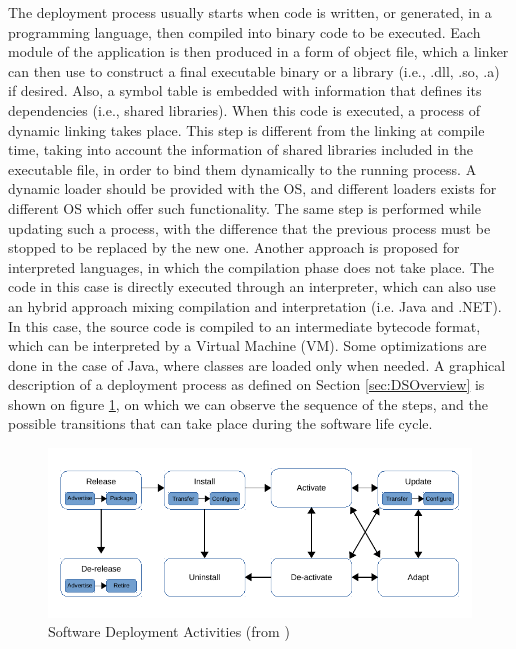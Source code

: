 The deployment process usually starts when code is written, or generated, in a programming language, then compiled into binary code to be executed.
Each module of the application is then produced in a form of object file, which a linker can then use to construct a final executable binary or a library (i.e., .dll, .so, .a) if desired.
Also, a symbol table is embedded with information that defines its dependencies (i.e., shared libraries).
When this code is executed, a process of dynamic linking takes place.
This step is different from the linking at compile time, taking into account the information of shared libraries included in the executable file, in order to bind them dynamically to the running process.
A dynamic loader should be provided with the OS, and different loaders exists for different OS which offer such functionality.
The same step is performed while updating such a process, with the difference that the previous process must be stopped to be replaced by the new one.
Another approach is proposed for interpreted languages, in which the compilation phase does not take place.
The code in this case is directly executed through an interpreter, which can also use an hybrid approach mixing compilation and interpretation (i.e. Java and .NET).
In this case, the source code is compiled to an intermediate bytecode format, which can be interpreted by a Virtual Machine (VM).
Some optimizations are done in the case of Java, where classes are loaded only when needed.
A graphical description of a deployment process as defined on Section \ref{sec:DSOverview} is shown on figure \ref{fig:DeployActivities}, on which we can observe the sequence of the steps, and the possible transitions that can take place during the software life cycle.

\begin{figure}[htb]
	\centering
	\includegraphics[width=1\columnwidth]{chapters/stateOfTheArt.images/DeploymentActivities.pdf}
	\caption{Software Deployment Activities (from  \cite{gunalp2014continuous})}
	\label{fig:DeployActivities}
\end{figure}

